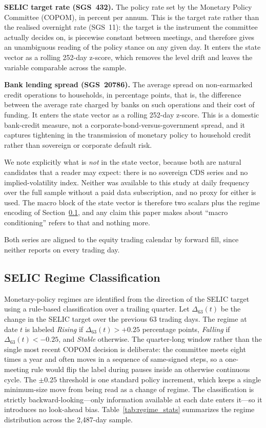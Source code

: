 \textbf{SELIC target rate (SGS~432).}
The policy rate set by the Monetary Policy Committee (COPOM), in percent per
annum.
This is the target rate rather than the realised overnight rate (SGS~11): the
target is the instrument the committee actually decides on, is piecewise constant
between meetings, and therefore gives an unambiguous reading of the policy stance
on any given day.
It enters the state vector as a rolling 252-day z-score, which removes the level
drift and leaves the variable comparable across the sample.

\textbf{Bank lending spread (SGS~20786).}
The average spread on non-earmarked credit operations to households, in
percentage points, that is, the difference between the average rate charged by
banks on such operations and their cost of funding.
It enters the state vector as a rolling 252-day z-score.
This is a domestic bank-credit measure, not a corporate-bond-versus-government
spread, and it captures tightening in the transmission of monetary policy to
household credit rather than sovereign or corporate default risk.

We note explicitly what is \emph{not} in the state vector, because both are
natural candidates that a reader may expect: there is no sovereign CDS series and
no implied-volatility index.
Neither was available to this study at daily frequency over the full sample
without a paid data subscription, and no proxy for either is used.
The macro block of the state vector is therefore two scalars plus the regime
encoding of Section~\ref{subsec:data_regimes}, and any claim this paper makes
about ``macro conditioning'' refers to that and nothing more.

Both series are aligned to the equity trading calendar by forward fill, since
neither reports on every trading day.

\subsection{SELIC Regime Classification}
\label{subsec:data_regimes}

Monetary-policy regimes are identified from the direction of the SELIC target
using a rule-based classification over a trailing quarter.
Let $\Delta_{63}(t)$ be the change in the SELIC target over the previous 63
trading days.
The regime at date $t$ is labeled \emph{Rising} if
$\Delta_{63}(t) > +0.25$ percentage points, \emph{Falling} if
$\Delta_{63}(t) < -0.25$, and \emph{Stable} otherwise.
The quarter-long window rather than the single most recent COPOM decision is
deliberate: the committee meets eight times a year and often moves in a sequence
of same-signed steps, so a one-meeting rule would flip the label during pauses
inside an otherwise continuous cycle.
The $\pm 0.25$ threshold is one standard policy increment, which keeps a single
minimum-size move from being read as a change of regime.
The classification is strictly backward-looking---only information available at
each date enters it---so it introduces no look-ahead bias.
Table~\ref{tab:regime_stats} summarizes the regime distribution across the
2,487-day sample.

